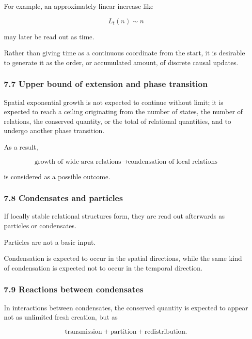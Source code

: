 \documentclass[
  a4paper,
]{article}
\begin{document}
For example, an approximately linear increase like

\[
\boxed{
L_t(n)\sim n
}
\]

may later be read out as time.

Rather than giving time as a continuous coordinate from the start, it is
desirable to generate it as the order, or accumulated amount, of
discrete causal updates.

\subsubsection{7.7 Upper bound of extension and phase
transition}\label{upper-bound-of-extension-and-phase-transition}

Spatial exponential growth is not expected to continue without limit; it
is expected to reach a ceiling originating from the number of states,
the number of relations, the conserved quantity, or the total of
relational quantities, and to undergo another phase transition.

As a result,

\[
\boxed{
\text{growth of wide-area relations}
\rightarrow
\text{condensation of local relations}
}
\]

is considered as a possible outcome.

\subsubsection{7.8 Condensates and
particles}\label{condensates-and-particles}

If locally stable relational structures form, they are read out
afterwards as particles or condensates.

Particles are not a basic input.

Condensation is expected to occur in the spatial directions, while the
same kind of condensation is expected not to occur in the temporal
direction.

\subsubsection{7.9 Reactions between
condensates}\label{reactions-between-condensates}

In interactions between condensates, the conserved quantity is expected
to appear not as unlimited fresh creation, but as

\[
\boxed{
\text{transmission}+\text{partition}+\text{redistribution}.
}
\]
\end{document}

